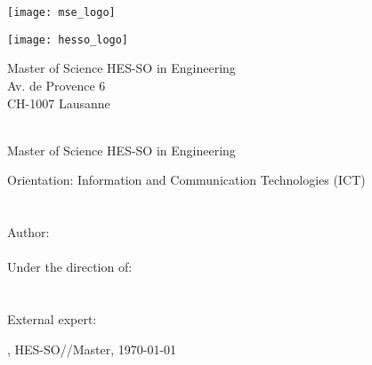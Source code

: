 
\begin{titlepage}
	\begin{flushright}
		\begin{minipage}{0.5\textwidth}
			\begin{flushleft}
				\texttt{[image: mse\_logo]}
			\end{flushleft}
		\end{minipage}%
		\begin{minipage}{0.5\textwidth}
			\begin{flushright}
				\texttt{[image: hesso\_logo]}
			\end{flushright}
		\end{minipage}
		\begin{flushleft}
			\footnotesize
			Master of Science HES-SO in Engineering \\
			Av. de Provence 6 \\
			CH-1007 Lausanne
		\end{flushleft}
		~\\[0.5cm]
		
		{
		\Huge Master of Science HES-SO in Engineering\\[0.5cm]
		}
		
		{
		\LARGE Orientation: Information and Communication Technologies (ICT)\\[0.5cm]
		~\\[1cm]
		}
		{
			\Huge
			\ThesisTitle \\[1.5cm]
		}
		{
			\large
			Author:\\[-0.3cm]
			\Huge \Author \\[0.8cm]
		}
		{
			\large
			Under the direction of: \\
			\Director \\
			\DirectorResearchUnit \\[0.5cm]
		}
		{
			\large
			External expert: \\
			\ExternalExpert
		}
		\vfill
		
		{\large \Place, HES-SO//Master, \today}
		
	\end{flushright}
\end{titlepage}



